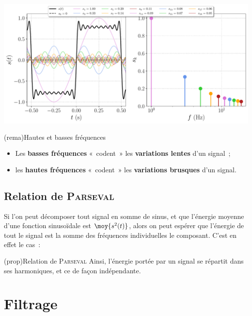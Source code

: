 \documentclass[../../main/main.tex]{subfiles}
\begin{document}
\begin{tcb*}[breakable]
	\begin{minipage}{\linewidth}
		\centering
		\includegraphics[width=.85\linewidth]{fft_creneau}
	\end{minipage}
\end{tcb*}

\begin{tcb*}(rema){Hautes et basses fréquences}
	\begin{itemize}
		\item Les \textbf{basses fréquences} «~codent~» les \textbf{variations
			      lentes} d'un signal~;
		\item les \textbf{hautes fréquences} «~codent~» les \textbf{variations
			      brusques} d'un signal.
	\end{itemize}
\end{tcb*}

\subsection{Relation de \textsc{Parseval}}
Si l'on peut décomposer tout signal en somme de sinus, et que l'énergie moyenne
d'une fonction sinusoïdale est $\moy{s^{2}(t)}$, alors on peut espérer que
l'énergie de tout le signal est la somme des fréquences individuelles  le
composant. C'est en effet le cas~:
\begin{tcb*}(prop){Relation de \textsc{Parseval}}
	\psw{
	\[
		\moy{s^{2}(t)} = s^{2}\ind{eff} =
		S_0{}^{2} + \frac{1}{2} \sum_{n=1}^{+\infty} S_k{}^{2}
	\]
	}
	Ainsi, l'énergie portée par un signal se répartit dans ses harmoniques, et ce
	de façon indépendante.
\end{tcb*}

\section{Filtrage}
\end{document}
